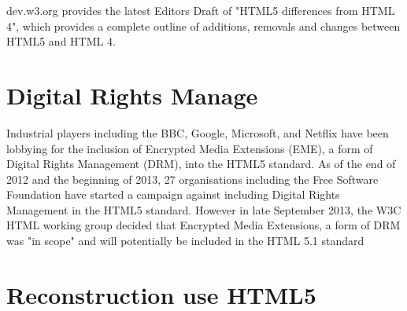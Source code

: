 dev.w3.org provides the latest Editors Draft of "HTML5 differences from HTML 4", which provides a complete outline of additions, removals and changes between HTML5 and HTML 4.



\chapter{Digital Rights Manage}


Industrial players including the BBC, Google, Microsoft, and Netflix have been lobbying for the inclusion of Encrypted Media Extensions (EME), a form of Digital Rights Management (DRM), into the HTML5 standard. As of the end of 2012 and the beginning of 2013, 27 organisations including the Free Software Foundation have started a campaign against including Digital Rights Management in the HTML5 standard. However in late September 2013, the W3C HTML working group decided that Encrypted Media Extensions, a form of DRM was "in scope" and will potentially be included in the HTML 5.1 standard






\chapter{Reconstruction use HTML5}













































